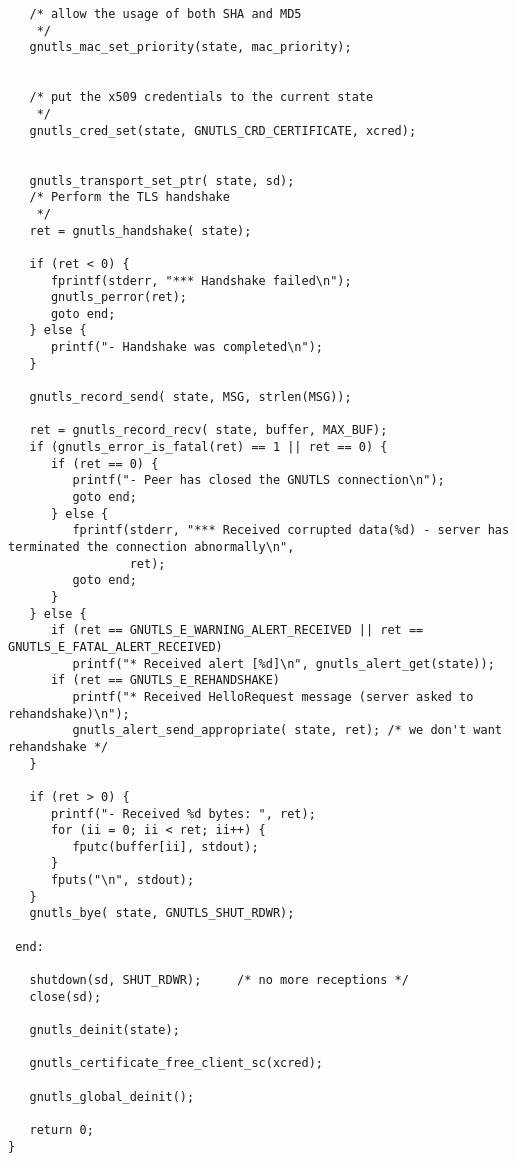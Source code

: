\begin{verbatim}
   /* allow the usage of both SHA and MD5
    */
   gnutls_mac_set_priority(state, mac_priority);


   /* put the x509 credentials to the current state
    */
   gnutls_cred_set(state, GNUTLS_CRD_CERTIFICATE, xcred);


   gnutls_transport_set_ptr( state, sd);
   /* Perform the TLS handshake
    */
   ret = gnutls_handshake( state);

   if (ret < 0) {
      fprintf(stderr, "*** Handshake failed\n");
      gnutls_perror(ret);
      goto end;
   } else {
      printf("- Handshake was completed\n");
   }

   gnutls_record_send( state, MSG, strlen(MSG));

   ret = gnutls_record_recv( state, buffer, MAX_BUF);
   if (gnutls_error_is_fatal(ret) == 1 || ret == 0) {
      if (ret == 0) {
         printf("- Peer has closed the GNUTLS connection\n");
         goto end;
      } else {
         fprintf(stderr, "*** Received corrupted data(%d) - server has terminated the connection abnormally\n",
                 ret);
         goto end;
      }
   } else {
      if (ret == GNUTLS_E_WARNING_ALERT_RECEIVED || ret == GNUTLS_E_FATAL_ALERT_RECEIVED)
         printf("* Received alert [%d]\n", gnutls_alert_get(state));
      if (ret == GNUTLS_E_REHANDSHAKE)
         printf("* Received HelloRequest message (server asked to rehandshake)\n");
         gnutls_alert_send_appropriate( state, ret); /* we don't want rehandshake */
   }

   if (ret > 0) {
      printf("- Received %d bytes: ", ret);
      for (ii = 0; ii < ret; ii++) {
         fputc(buffer[ii], stdout);
      }
      fputs("\n", stdout);
   }
   gnutls_bye( state, GNUTLS_SHUT_RDWR);

 end:

   shutdown(sd, SHUT_RDWR);     /* no more receptions */
   close(sd);

   gnutls_deinit(state);

   gnutls_certificate_free_client_sc(xcred);

   gnutls_global_deinit();

   return 0;
}

\end{verbatim}
